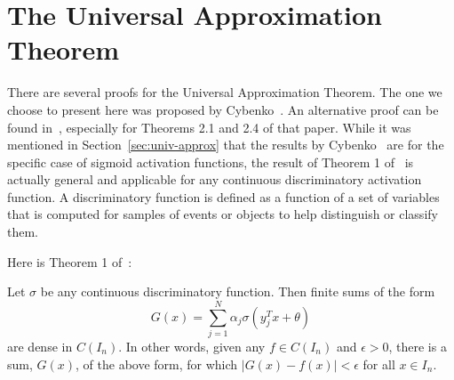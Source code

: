 \chapter{The Universal Approximation Theorem}\label{app:approx-theorem}

There are several proofs for the Universal Approximation Theorem. The one we choose to present here was proposed by Cybenko~\cite{cybenko1989}. An alternative proof can be found in~\cite{hornik1991approximation}, especially for Theorems 2.1 and 2.4 of that paper. While it was mentioned in Section~\ref{sec:univ-approx} that the results by Cybenko~\cite{cybenko1989} are for the specific case of sigmoid activation functions, the result of Theorem 1 of~\cite{cybenko1989} is actually general and applicable for any continuous discriminatory activation function. A discriminatory function is defined as a function of a set of variables that is computed for samples of events or objects to help distinguish or classify them.

Here is Theorem 1 of~\cite{cybenko1989}:

\begin{theorem}
\label{th:univ-theorem}
     Let $\sigma$ be any continuous discriminatory function. Then finite sums of the form
        \begin{equation}
        \label{eq:app-univ-approx-th}
            G(x) = \sum_{j=1}^{N} \alpha_j \sigma \left( y_j^T x + \theta \right)
        \end{equation}
    are dense in $C(I_n)$. In other words, given any $f \in C(I_n)$ and $\epsilon > 0$, there is a sum, $G(x)$, of the above form, for which $\left| G(x) - f(x)\right| < \epsilon $ for all $x \in I_n$.
\end{theorem}

